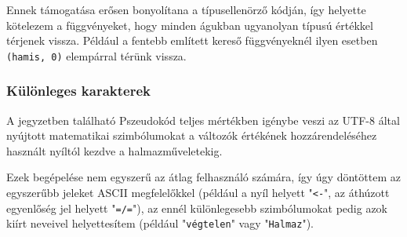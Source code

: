 Ennek támogatása erősen bonyolítana a típusellenörző kódján, így helyette kötelezem a függvényeket, hogy minden águkban ugyanolyan típusú értékkel térjenek vissza. Például a fentebb említett kereső függvényeknél ilyen esetben \texttt{(hamis, 0)} elempárral térünk vissza.

\subsubsection{Különleges karakterek}

A jegyzetben található Pszeudokód teljes mértékben igénybe veszi az UTF-8 által nyújtott matematikai szimbólumokat a változók értékének hozzárendeléséhez használt nyíltól kezdve a halmazműveletekig.

Ezek begépelése nem egyszerű az átlag felhasználó számára, így úgy döntöttem az egyszerűbb jeleket ASCII megfelelőkkel (például a nyíl helyett "\texttt{<-}", az áthúzott egyenlőség jel helyett "\texttt{=/=}"), az ennél különlegesebb szimbólumokat pedig azok kiírt neveivel helyettesítem (például "\texttt{végtelen}" vagy "\texttt{Halmaz}").
